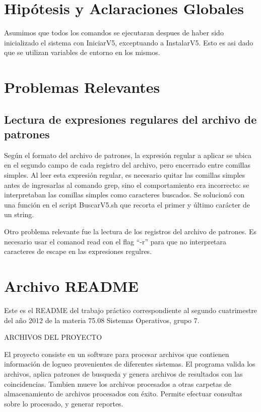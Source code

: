 \documentclass[a4paper,10pt,titlepage]{article}
\begin{document}

\section{Hip\'otesis y Aclaraciones Globales}

Asumimos que todos los comandos se ejecutaran despues de haber sido inicializado el sistema con IniciarV5, exceptuando a InstalarV5. Esto es asi dado que se utilizan variables de entorno en los mismos. 


\section{Problemas Relevantes}

\subsection{Lectura de expresiones regulares del archivo de patrones}

Según el formato del archivo de patrones, la expresión regular a aplicar se ubica en el segundo campo de cada registro del archivo, pero encerrado entre comillas simples. Al leer esta expresión regular, es necesario quitar las comillas simples antes de ingresarlas al comando grep, sino el comportamiento era incorrecto: se interpretaban las comillas simples como caracteres buscados. Se solucionó con una función en el script BuscarV5.sh que recorta el primer y último carácter de un string.

Otro problema relevante fue la lectura de los registros del archivo de patrones. Es necesario usar el comanod read con el flag “-r” para que no interpretara caracteres de escape en las expresiones regulres.

\section{Archivo README}


Este es el README del trabajo práctico correspondiente al segundo cuatrimestre del año 2012 de la materia 75.08 Sistemas Operativos, grupo 7.
 
ARCHIVOS DEL PROYECTO
 
El proyecto consiste en un software para procesar archivos que contienen información de logueo provenientes de diferentes sistemas. El programa valida los archivos, aplica patrones de busqueda y genera archivos de resultados con las coincidencias. Tambien mueve los archivos procesados a otras carpetas de almacenamiento de archivos procesados con éxito. Permite efectuar consultas sobre lo procesado, y generar reportes.
\end{document}
